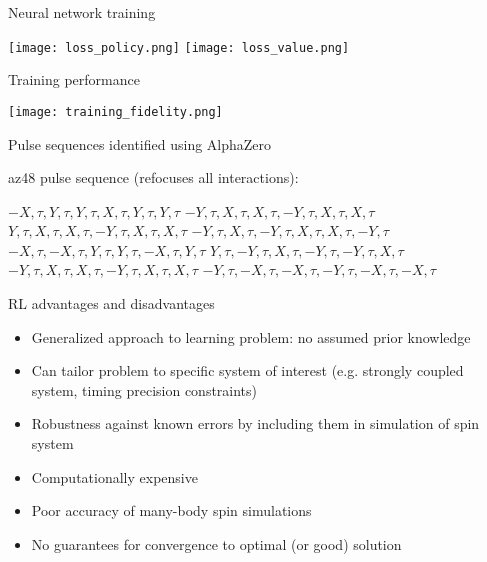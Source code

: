 \documentclass{beamer}
\begin{document}
\begin{frame}{Neural network training}

\texttt{[image: loss\_policy.png]}
\texttt{[image: loss\_value.png]}
\end{frame}

\begin{frame}{Training performance}

\texttt{[image: training\_fidelity.png]}
\end{frame}

\begin{frame}{Pulse sequences identified using AlphaZero}

\textrm{az48} pulse sequence (refocuses all interactions):

$ -X, \tau, Y, \tau, Y, \tau, X, \tau, Y, \tau, Y, \tau $
$ -Y, \tau, X, \tau, X, \tau, -Y, \tau, X, \tau, X, \tau $
$ Y, \tau, X, \tau, X, \tau, -Y, \tau, X, \tau, X, \tau $
$ -Y, \tau, X, \tau, -Y, \tau, X, \tau, X, \tau, -Y, \tau $
$ -X, \tau, -X, \tau, Y, \tau, Y, \tau, -X, \tau, Y, \tau $
$ Y, \tau, -Y, \tau, X, \tau, -Y, \tau, -Y, \tau, X, \tau $
$ -Y, \tau, X, \tau, X, \tau, -Y, \tau, X, \tau, X, \tau $
$ -Y, \tau, -X, \tau, -X, \tau, -Y, \tau, -X, \tau, -X, \tau $

\end{frame}

\begin{frame}{RL advantages and disadvantages}

\begin{itemize}
    \item Generalized approach to learning problem: no assumed prior knowledge
    \item Can tailor problem to specific system of interest (e.g. strongly coupled system, timing precision constraints)
    \item Robustness against known errors by including them in simulation of spin system
\end{itemize}

\pause

\begin{itemize}
    \color{red}
    \item Computationally expensive
    \item Poor accuracy of many-body spin simulations
    \item No guarantees for convergence to optimal (or good) solution
\end{itemize}

\end{frame}
\end{document}
